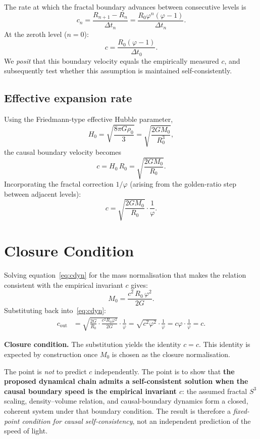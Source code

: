 \documentclass[11pt,a4paper]{article}
\newcommand{\Rzero}{R_0}
\newcommand{\Mzero}{M_0}
\newcommand{\ph}{\varphi}
\begin{document}
The rate at which the fractal boundary advances between consecutive levels is
\[
  c_n = \frac{R_{n+1}-R_n}{\Delta t_n}
       = \frac{\Rzero\ph^n(\ph-1)}{\Delta t_n}.
\]
At the zeroth level ($n=0$):
\[
  c = \frac{\Rzero(\ph-1)}{\Delta t_0}.
\]
We \emph{posit} that this boundary velocity equals the empirically measured $c$,
and subsequently test whether this assumption is maintained self-consistently.

\subsection{Effective expansion rate}

Using the Friedmann-type effective Hubble parameter,
\[
  H_0 = \sqrt{\frac{8\pi G\rho_0}{3}}
       = \sqrt{\frac{2G\Mzero}{\Rzero^3}},
\]
the causal boundary velocity becomes
\[
  c = H_0\,\Rzero = \sqrt{\frac{2G\Mzero}{\Rzero}}.
\]
Incorporating the fractal correction $1/\ph$ (arising from the golden-ratio step
between adjacent levels):
\begin{equation}\label{eq:cdyn}
  c = \sqrt{\frac{2G\Mzero}{\Rzero}}\cdot\frac{1}{\ph}.
\end{equation}

\section{Closure Condition}
\label{sec:closure}

Solving equation~\eqref{eq:cdyn} for the mass normalisation that makes the
relation consistent with the empirical invariant $c$ gives:
\[
  \Mzero = \frac{c^2\,\Rzero\,\ph^2}{2G}.
\]
Substituting back into~\eqref{eq:cdyn}:
\begin{align}
  c_{\mathrm{out}}
  &= \sqrt{\frac{2G}{\Rzero}\cdot\frac{c^2\Rzero\ph^2}{2G}}\cdot\frac{1}{\ph}
   = \sqrt{c^2\ph^2}\cdot\frac{1}{\ph}
   = c\ph\cdot\frac{1}{\ph}
   = c.\label{eq:closure}
\end{align}

\begin{closurebox}
\textbf{Closure condition.}\;
The substitution yields the identity $c = c$. This identity is expected by
construction once $\Mzero$ is chosen as the closure normalisation.

\smallskip
The point is \emph{not} to predict $c$ independently. The point is to show that
\textbf{the proposed dynamical chain admits a self-consistent solution when the
causal boundary speed is the empirical invariant $c$}: the assumed fractal $S^3$
scaling, density--volume relation, and causal-boundary dynamics form a closed,
coherent system under that boundary condition. The result is therefore a
\emph{fixed-point condition for causal self-consistency}, not an independent
prediction of the speed of light.
\end{closurebox}
\end{document}
